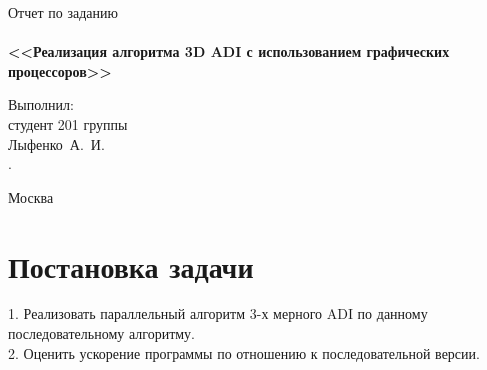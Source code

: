 \documentclass[a4paper,12pt,titlepage,draft]{article}
\begin{document}
\begin{titlepage}
    \begin{center}
	{\Large \sc Отчет по заданию}\\
	~\\
	{\large \bf <<Реализация алгоритма 3D ADI с использованием графических процессоров>>}\\ 
    \end{center}
    \begin{flushright}
	\vfill {Выполнил:\\
	студент 201 группы\\
	Лыфенко~А.~И.\\.}
    \end{flushright}
    \begin{center}
	\vfill
	{\small Москва\\ \the\year{}}
    \end{center}
\end{titlepage}

\section{Постановка задачи}
1. Реализовать параллельный алгоритм 3-х мерного ADI по данному последовательному алгоритму.\\

2. Оценить ускорение программы по отношению к последовательной версии.\\
\newpage
\end{document}
